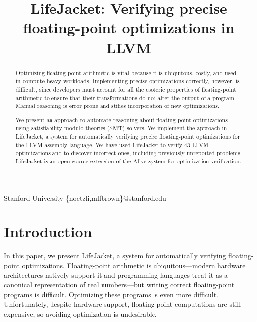 \documentclass[preprint, numbers]{sigplanconf}
\newcommand{\xxx}{LifeJacket}
\newcommand{\numverified}{43}
\newcommand{\numbugs}{8}
\newcommand{\numnewbugs}{3}
\begin{document}
\title{\xxx{}: Verifying precise floating-point
optimizations in LLVM}

           {Stanford University}
           {\{noetzli,mlfbrown\}@stanford.edu}

\maketitle

\begin{abstract}
  Optimizing floating-point arithmetic is vital because it is ubiquitous,
  costly, and used in compute-heavy workloads. Implementing precise
  optimizations correctly, however, is difficult, since developers must account
  for all the esoteric properties of floating-point arithmetic to ensure that
  their transformations do not alter the output of a program. Manual reasoning
  is error prone and stifles incorporation of new optimizations.

  We present an approach to automate reasoning about floating-point
  optimizations using satisfiability modulo theories (SMT) solvers.  We
  implement the approach in \xxx{}, a system for automatically verifying
  precise floating-point optimizations for the LLVM assembly language. We have
  used \xxx{} to verify \numverified{} LLVM optimizations and to discover
  \numberstringnum{\numbugs} incorrect ones, including
  \numberstringnum{\numnewbugs} previously unreported problems. \xxx{} is an
  open source extension of the Alive system for optimization verification.

\end{abstract}


\section{Introduction}
In this paper, we present \xxx{}, a system for automatically verifying
floating-point optimizations. Floating-point arithmetic is ubiquitous---modern
hardware architectures natively support it and programming languages treat it
as a canonical representation of real numbers---but writing correct
floating-point programs is difficult. Optimizing these programs is even more
difficult. Unfortunately, despite hardware support, floating-point computations
are still expensive, so avoiding optimization is undesirable.
\end{document}
